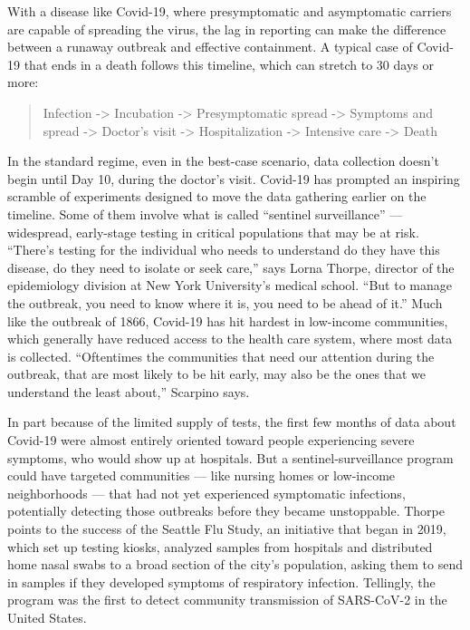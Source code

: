 With a disease like Covid-19, where presymptomatic and asymptomatic
carriers are capable of spreading the virus, the lag in reporting can
make the difference between a runaway outbreak and effective
containment. A typical case of Covid-19 that ends in a death follows
this timeline, which can stretch to 30 days or more:

\begin{quote}
Infection -\textgreater{} Incubation -\textgreater{} Presymptomatic
spread -\textgreater{} Symptoms and spread -\textgreater{} Doctor's
visit -\textgreater{} Hospitalization -\textgreater{} Intensive care
-\textgreater{} Death
\end{quote}

In the standard regime, even in the best-case scenario, data collection
doesn't begin until Day 10, during the doctor's visit. Covid-19 has
prompted an inspiring scramble of experiments designed to move the data
gathering earlier on the timeline. Some of them involve what is called
``sentinel surveillance'' --- widespread, early-stage testing in
critical populations that may be at risk. ``There's testing for the
individual who needs to understand do they have this disease, do they
need to isolate or seek care,'' says Lorna Thorpe, director of the
epidemiology division at New York University's medical school. ``But to
manage the outbreak, you need to know where it is, you need to be ahead
of it.'' Much like the outbreak of 1866, Covid-19 has hit hardest in
low-income communities, which generally have reduced access to the
health care system, where most data is collected. ``Oftentimes the
communities that need our attention during the outbreak, that are most
likely to be hit early, may also be the ones that we understand the
least about,'' Scarpino says.

In part because of the limited supply of tests, the first few months of
data about Covid-19 were almost entirely oriented toward people
experiencing severe symptoms, who would show up at hospitals. But a
sentinel-surveillance program could have targeted communities --- like
nursing homes or low-income neighborhoods --- that had not yet
experienced symptomatic infections, potentially detecting those
outbreaks before they became unstoppable. Thorpe points to the success
of the Seattle Flu Study, an initiative that began in 2019, which set up
testing kiosks, analyzed samples from hospitals and distributed home
nasal swabs to a broad section of the city's population, asking them to
send in samples if they developed symptoms of respiratory infection.
Tellingly, the program was the first to detect community transmission of
SARS-CoV-2 in the United States.

